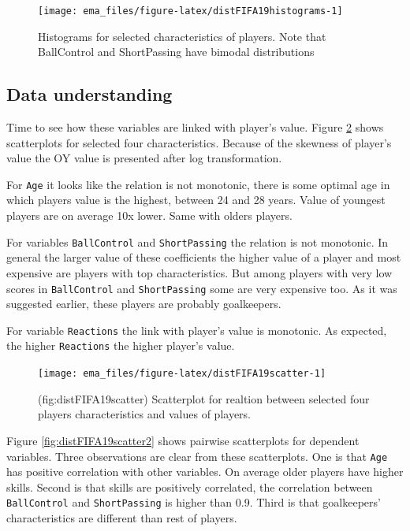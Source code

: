\documentclass[12pt,]{krantz}
\begin{document}
\begin{figure}

{\centering \texttt{[image: ema\_files/figure-latex/distFIFA19histograms-1]} 

}

\caption{Histograms for selected characteristics of players. Note that BallControl and ShortPassing have bimodal distributions}\label{fig:distFIFA19histograms}
\end{figure}

\hypertarget{data-understanding}{%
\subsection{Data understanding}\label{data-understanding}}

Time to see how these variables are linked with player's value.
Figure \ref{fig:distFIFA19scatter} shows scatterplots for selected four characteristics. Because of the skewness of player's value the OY value is presented after log transformation.

For \texttt{Age} it looks like the relation is not monotonic, there is some optimal age in which players value is the highest, between 24 and 28 years. Value of youngest players are on average 10x lower. Same with olders players.

For variables \texttt{BallControl} and \texttt{ShortPassing} the relation is not monotonic. In general the larger value of these coefficients the higher value of a player and most expensive are players with top characteristics. But among players with very low scores in \texttt{BallControl} and \texttt{ShortPassing} some are very expensive too. As it was suggested earlier, these players are probably goalkeepers.

For variable \texttt{Reactions} the link with player's value is monotonic. As expected, the higher \texttt{Reactions} the higher player's value.

\begin{figure}

{\centering \texttt{[image: ema\_files/figure-latex/distFIFA19scatter-1]} 

}

\caption{(fig:distFIFA19scatter) Scatterplot for realtion between selected four players characteristics and values of players.}\label{fig:distFIFA19scatter}
\end{figure}

Figure \ref{fig:distFIFA19scatter2} shows pairwise scatterplots for dependent variables. Three observations are clear from these scatterplots. One is that \texttt{Age} has positive correlation with other variables. On average older players have higher skills. Second is that skills are positively correlated, the correlation between \texttt{BallControl} and \texttt{ShortPassing} is higher than 0.9. Third is that goalkeepers' characteristics are different than rest of players.
\end{document}
